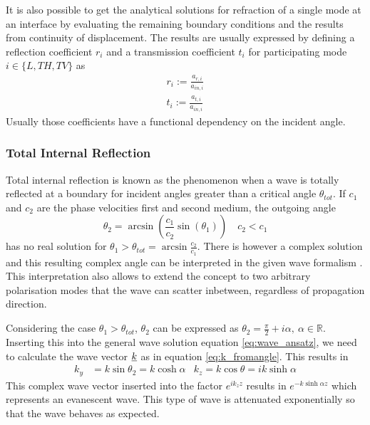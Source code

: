 
It is also possible to get the analytical solutions for refraction of a single
mode at an interface by evaluating the remaining boundary conditions and the
results from continuity of displacement. The results are usually expressed by
defining a reflection coefficient $r_i$ and a transmission coefficient $t_i$
for participating mode $i \in\{L, TH, TV\}$ as
\begin{align}
    r_i := \frac{a_{r,i}}{a_{in,i}} \\
    t_i := \frac{a_{t,i}}{a_{in,i}}
\end{align}
Usually those coefficients have a functional dependency on the incident angle.

\subsubsection{Total Internal Reflection}
Total internal reflection is known as the phenomenon when a wave is totally
reflected at a boundary for incident angles greater than a critical angle
$\theta_{tot}$. If $c_1$ and $c_2$ are the phase velocities first and second
medium, the outgoing angle
\begin{equation}
    \theta_2 = \arcsin( \frac{c_1}{c_2} \sin(\theta_1)) \quad c_2 < c_1
\end{equation}
has no real solution for $\theta_1 > \theta_{tot} = \arcsin \frac{c_2}{c_1}$.
There is however a complex solution and this resulting complex angle can be
interpreted in the given wave formalism \cite[5]{brekhovskikh2012waves}. This
interpretation also allows to extend the concept to two arbitrary polarisation
modes that the wave can scatter inbetween, regardless of propagation direction.

Considering the case $\theta_1 > \theta_{tot}$, $\theta_2$ can be expressed as
$\theta_2 = \frac{\pi}{2} + i\alpha,\ \alpha\in\mathbb{R}$. Inserting this into
the general wave solution equation \ref{eq:wave_ansatz}, we need to calculate
the wave vector $\underline{k}$ as in equation \ref{eq:k_fromangle}. This results
in
\begin{align}
    k_y & = k \sin\theta_2 = k \cosh\alpha & k_z= k \cos\theta = ik \sinh\alpha
\end{align}
This complex wave vector inserted into the factor $e^{ik_zz}$ results in
$e^{-k\sinh\alpha z}$ which represents an evanescent wave. This type of wave is
attenuated exponentially so that the wave behaves as expected.

